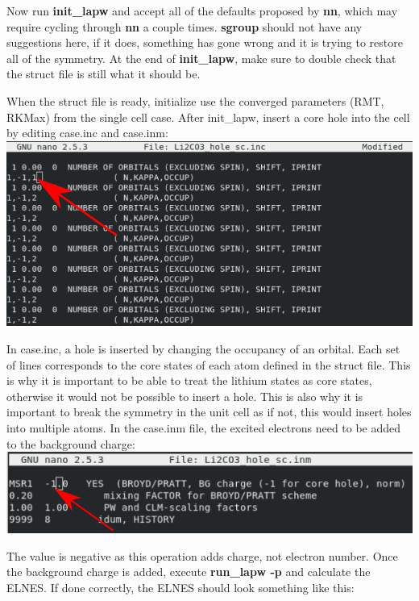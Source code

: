 \documentclass[12pt]{article}
\begin{document}
Now run \textbf{init\_lapw} and accept all of the defaults proposed by \textbf{nn}, which may require cycling through \textbf{nn } a couple times.  \textbf{sgroup} should not have any suggestions here, if it does, something has gone wrong and it is trying to restore all of the symmetry.  At the end of \textbf{init\_lapw}, make sure to double check that the struct file is still what it should be.  


When the struct file is ready, initialize use the converged parameters (RMT, RKMax) from the single cell case.  After init\_lapw, insert a core hole into the cell by editing case.inc and case.inm: \\

\includegraphics[scale=0.5]{./images/hole_inc.png}

In case.inc, a hole is inserted by changing the occupancy of an orbital.  Each set of lines corresponds to the core states of each atom defined in the struct file.  This is why it is important to be able to treat the lithium states as core states, otherwise it would not be possible to insert a hole.  This is also why it is important to break the symmetry in the unit cell as if not, this would insert holes into multiple atoms. In the case.inm file, the excited electrons need to be added to the background charge: \\

\includegraphics[scale=0.5]{./images/hole_inm.png}

The value is negative as this operation adds charge, not electron number.  Once the background charge is added, execute \textbf{run\_lapw -p} and calculate the ELNES.  If done correctly, the ELNES should look something like this:  
\end{document}
